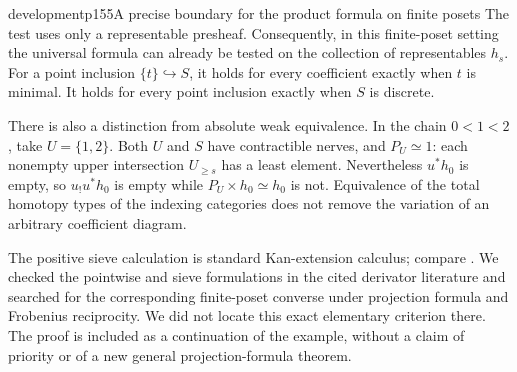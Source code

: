 \begin{dcomment}{development}{p155}{A precise boundary for the product formula on finite posets}
The test uses only a representable presheaf. Consequently, in this finite-poset setting the universal formula can already be tested on the collection of representables $h_s$. For a point inclusion $\{t\}\hookrightarrow S$, it holds for every coefficient exactly when $t$ is minimal. It holds for every point inclusion exactly when $S$ is discrete.

There is also a distinction from absolute weak equivalence. In the chain $0<1<2$, take $U=\{1,2\}$. Both $U$ and $S$ have contractible nerves, and $P_U\simeq1$: each nonempty upper intersection $U_{\ge s}$ has a least element. Nevertheless $u^*h_0$ is empty, so $u_!u^*h_0$ is empty while $P_U\times h_0\simeq h_0$ is not. Equivalence of the total homotopy types of the indexing categories does not remove the variation of an arbitrary coefficient diagram.

The positive sieve calculation is standard Kan-extension calculus; compare \citet[Proposition~1.23, with the indexing categories replaced by their opposites]{Groth2013}. We checked the pointwise and sieve formulations in the cited derivator literature and searched for the corresponding finite-poset converse under projection formula and Frobenius reciprocity. We did not locate this exact elementary criterion there. The proof is included as a continuation of the example, without a claim of priority or of a new general projection-formula theorem.
\end{dcomment}

